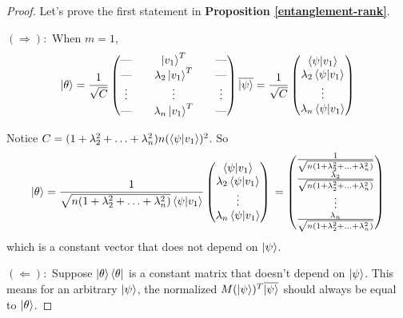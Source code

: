 \begin{proof}
\bigskip
Let's prove the first statement in \textbf{Proposition \ref{entanglement-rank}}.

$(\Rightarrow):$ When $m=1$, 
\begin{equation}
\ket{\theta}=\frac{1}{\sqrt{C}}\begin{pmatrix}
\text{---} && \ket{v_1}^T &&\text{---} \\
\text{---} && \lambda_2\ket{v_1}^T &&\text{---} \\
\vdots && \vdots && \vdots\\
\text{---} && \lambda_n\ket{v_1}^T &&\text{---} \\
\end{pmatrix}
\overline{\ket{\psi}}\\
=\frac{1}{\sqrt{C}}\begin{pmatrix}
\braket{\psi|v_1}\\
\lambda_2 \braket{\psi|v_1}\\
\vdots\\
\lambda_n \braket{\psi|v_1}
\end{pmatrix}
\end{equation}

Notice $C=(1+\lambda_2^2+\hdots+\lambda_n^2)n(\braket{\psi|v_1})^2$. So\\
\begin{equation}
\ket{\theta}=\frac{1}{\sqrt{n(1+\lambda_2^2+\hdots+\lambda_n^2)}\braket{\psi|v_1}}
\begin{pmatrix}
\braket{\psi|v_1}\\
\lambda_2 \braket{\psi|v_1}\\
\vdots\\
\lambda_n \braket{\psi|v_1}
\end{pmatrix}\\
=\begin{pmatrix}
\frac{1}{\sqrt{n(1+\lambda_2^2+\hdots+\lambda_n^2)}}\\
\frac{\lambda_2}{\sqrt{n(1+\lambda_2^2+\hdots+\lambda_n^2)}}\\
\vdots\\
\frac{\lambda_n}{\sqrt{n(1+\lambda_2^2+\hdots+\lambda_n^2)}}
\end{pmatrix} 
\end{equation}
which is a constant vector that does not depend on $\ket{\psi}$.

\bigskip
$(\Leftarrow):$ Suppose $\ket{\theta}\bra{\theta}$ is a constant matrix that doesn't depend on $\ket{\psi}$. This means for an arbitrary $\ket{\psi}$, the normalized $M(\ket{\psi})^T \overline{\ket{\psi}}$ should always be equal to $\ket{\theta}$.


\end{proof}
